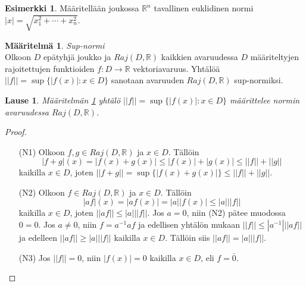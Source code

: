 \documentclass[12pt,a4paper,leqno]{report}
\newcommand{\R}{\mathbb{R}}
\theoremstyle{plain}
\newtheorem{lause}[equation]{Lause}
\theoremstyle{definition}
\newtheorem{maar}[equation]{Määritelmä}
\newtheorem{esim}[equation]{Esimerkki}
\theoremstyle{remark}
\begin{document}
\begin{esim}
Määritellään joukossa $\R ^n$ tavallinen euklidinen normi $|x| = \sqrt{x^{2}_{1} + \cdots +x^{2}_{n}}$.

\end{esim}

\begin{maar}\label{sup-normi} \emph{Sup-normi}\\
Olkoon $D$ epätyhjä joukko ja $Raj(D,\R )$ kaikkien avaruudessa $D$ määriteltyjen rajoitettujen funktioiden $f\colon D\rightarrow \R$ vektoriavaruus. 
Yhtälöä $||f||=\sup\{|f(x)|\colon x\in D\}$ sanotaan avaruuden $Raj(D,\R )$ sup-normiksi.
\end{maar} 
\begin{lause}
Määritelmän \ref{sup-normi} yhtälö $||f||=\sup\{|f(x)|\colon x\in D\}$ määrittelee normin avaruudessa $Raj(D,\R )$. %

\end{lause} 

\begin{proof}
\begin{itemize}
\item[(N1)] Olkoon $f,g\in Raj(D,\R )$ ja $x\in D$. Tällöin
\begin{equation*}
|f+g|(x)=|f(x)+g(x)|\leq|f(x)|+|g(x)|\leq||f||+||g||
\end{equation*}
kaikilla $x\in D$, joten $||f+g||=\sup\{|f(x)+g(x)|\}\leq||f||+||g||$.

\item[(N2)] Olkoon $f\in Raj(D,\R )$ ja $x\in D$. Tällöin
\begin{equation*}
|af|(x)=|af(x)|=|a||f(x)|\leq|a|||f||
\end{equation*}
kaikilla $x\in D$, joten $||af||\leq|a|||f||$. Jos $a=0$, niin (N2) pätee muodossa $0=0$. %
Jos $a\neq 0$, niin $f=a^{-1}af$ ja edellisen yhtälön %
mukaan $||f||\leq|a^{-1}|||af||$
ja edelleen $||af||\geq|a|||f||$ kaikilla $x\in D$. Tällöin siis $||af||=|a|||f||$.

\item[(N3)]Jos $||f||=0$, niin $|f(x)|=0$ kaikilla $x\in D$, eli  $f=\bar{0}$.
\end{itemize} 
\end{proof}
\end{document}
